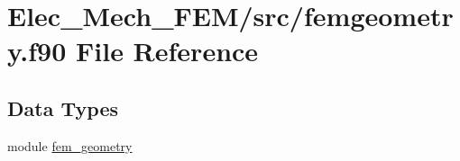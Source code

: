 \hypertarget{femgeometry_8f90}{}\section{Elec\+\_\+\+Mech\+\_\+\+F\+E\+M/src/femgeometry.f90 File Reference}
\label{femgeometry_8f90}
\subsection*{Data Types}
\begin{DoxyCompactItemize}
\item 
module \hyperlink{classfem__geometry}{fem\+\_\+geometry}
\end{DoxyCompactItemize}
